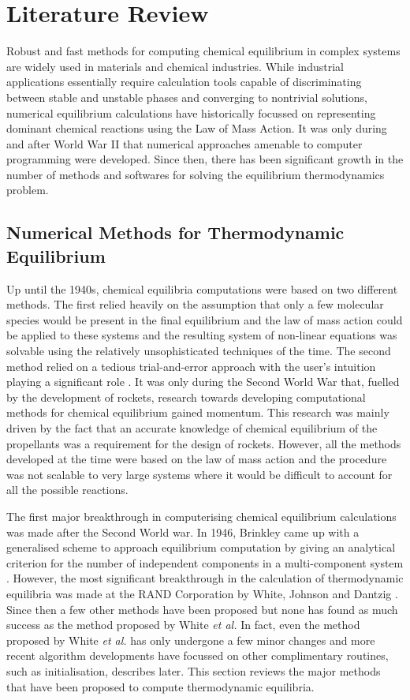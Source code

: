 \chapter{Literature Review} \label{chap:litreview}

	Robust and fast methods for computing chemical equilibrium in complex systems are widely used in materials and chemical industries. While industrial applications essentially require calculation tools capable of discriminating between stable and unstable phases and converging to nontrivial solutions, numerical equilibrium calculations have historically focussed on representing dominant chemical reactions using the Law of Mass Action. It was only during and after World War {II} that numerical approaches amenable to computer programming were developed. Since then, there has been significant growth in the number of methods and softwares for solving the equilibrium thermodynamics problem.
	
\section{Numerical Methods for Thermodynamic Equilibrium}
	Up until the 1940s, chemical equilibria computations were based on two different methods. The first relied heavily on the assumption that only a few molecular species would be present in the final equilibrium and the law of mass action could be applied to these systems and the resulting system of non-linear equations was solvable using the relatively unsophisticated techniques of the time. The second method relied on a tedious trial-and-error approach with the user's intuition playing a significant role \cite{vanZeggeren11}. It was only during the Second World War that, fuelled by the development of rockets, research towards developing computational methods for chemical equilibrium gained momentum. This research was mainly driven by the fact that an accurate knowledge of chemical equilibrium of the propellants was a requirement for the design of rockets. However, all the methods developed at the time were based on the law of mass action and the procedure was not scalable to very large systems where it would be difficult to account for all the possible reactions.

	The first major breakthrough in computerising chemical equilibrium calculations was made after the Second World war. In 1946, Brinkley came up with a generalised scheme to approach equilibrium computation by giving an analytical criterion for the number of independent components in a multi-component system \cite{vanZeggeren11}. However, the most significant breakthrough in the calculation of thermodynamic equilibria was made at the RAND Corporation by White, Johnson and Dantzig  \cite{White:58}. Since then a few other methods have been proposed but none has found as much success as the method proposed by White \textit{et al.} In fact, even the method proposed by White \textit{et al.} has only undergone a few minor changes and more recent algorithm developments have focussed on other complimentary routines, such as initialisation, describes later. This section reviews the major methods that have been proposed to compute thermodynamic equilibria.

